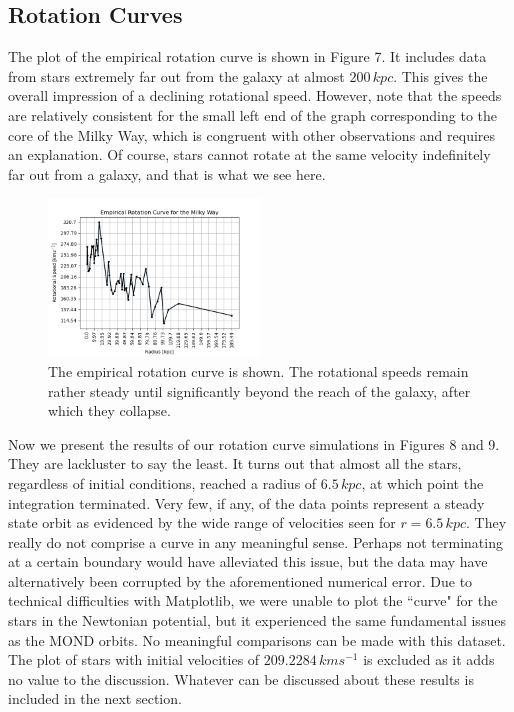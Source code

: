 \documentclass[11pt, twocolumn]{article}
\begin{document}
    \subsection*{Rotation Curves}
    The plot of the empirical rotation curve is shown in Figure 7. It includes data from stars extremely far out from the galaxy at almost $200 \, \si{kpc}$. This gives the overall impression of a declining rotational speed. However, note that the speeds are relatively consistent for the small left end of the graph corresponding to the core of the Milky Way, which is congruent with other observations and requires an explanation. Of course, stars cannot rotate at the same velocity indefinitely far out from a galaxy, and that is what we see here.
    
    \begin{figure}[h]
        \includegraphics[width=0.5\textwidth]{images/empirical.png}
        \caption{The empirical rotation curve is shown. The rotational speeds remain rather steady until significantly beyond the reach of the galaxy, after which they collapse.}
        \label{fig:rotation}
    \end{figure}

    Now we present the results of our rotation curve simulations in Figures 8 and 9. They are lackluster to say the least. It turns out that almost all the stars, regardless of initial conditions, reached a radius of $6.5 \, \si{kpc}$, at which point the integration terminated. Very few, if any, of the data points represent a steady state orbit as evidenced by the wide range of velocities seen for $r = 6.5 \, \si{kpc}$. They really do not comprise a curve in any meaningful sense. Perhaps not terminating at a certain boundary would have alleviated this issue, but the data may have alternatively been corrupted by the aforementioned numerical error. Due to technical difficulties with Matplotlib, we were unable to plot the ``curve" for the stars in the Newtonian potential, but it experienced the same fundamental issues as the MOND orbits. No meaningful comparisons can be made with this dataset. The plot of stars with initial velocities of $209.2284 \, \si{km s^{-1}}$ is excluded as it adds no value to the discussion. Whatever can be discussed about these results is included in the next section.
\end{document}
